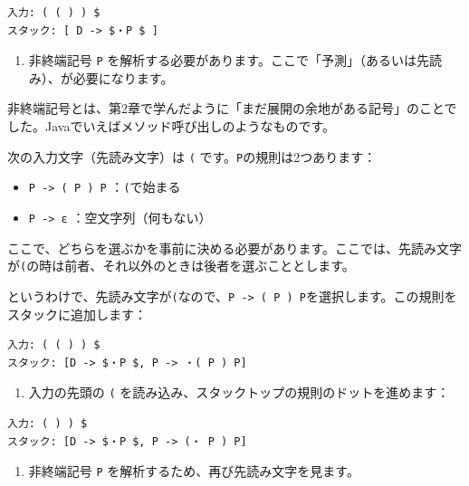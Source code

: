 \begin{verbatim}
入力: ( ( ) ) $
スタック: [ D -> $・P $ ]
\end{verbatim}

\begin{enumerate}
\def\labelenumi{\arabic{enumi}.}
\setcounter{enumi}{1}
\tightlist
\item
  非終端記号 \texttt{P}
  を解析する必要があります。ここで「予測」（あるいは先読み）、が必要になります。
\end{enumerate}

非終端記号とは、第2章で学んだように「まだ展開の余地がある記号」のことでした。Javaでいえばメソッド呼び出しのようなものです。

次の入力文字（先読み文字）は \texttt{(}
です。\texttt{P}の規則は2つあります：

\begin{itemize}
\tightlist
\item
  \texttt{P\ -\textgreater{}\ (\ P\ )\ P} ：\texttt{(}で始まる
\item
  \texttt{P\ -\textgreater{}\ ε} ：空文字列（何もない）
\end{itemize}

ここで、どちらを選ぶかを事前に決める必要があります。ここでは、先読み文字が\texttt{(}の時は前者、それ以外のときは後者を選ぶこととします。

というわけで、先読み文字が\texttt{(}なので、\texttt{P\ -\textgreater{}\ (\ P\ )\ P}を選択します。この規則をスタックに追加します：

\begin{verbatim}
入力: ( ( ) ) $
スタック: [D -> $・P $, P -> ・( P ) P]
\end{verbatim}

\begin{enumerate}
\def\labelenumi{\arabic{enumi}.}
\setcounter{enumi}{2}
\tightlist
\item
  入力の先頭の \texttt{(}
  を読み込み、スタックトップの規則のドットを進めます：
\end{enumerate}

\begin{verbatim}
入力: ( ) ) $
スタック: [D -> $・P $, P -> (・ P ) P]
\end{verbatim}

\begin{enumerate}
\def\labelenumi{\arabic{enumi}.}
\setcounter{enumi}{3}
\tightlist
\item
  非終端記号 \texttt{P} を解析するため、再び先読み文字を見ます。
\end{enumerate}

